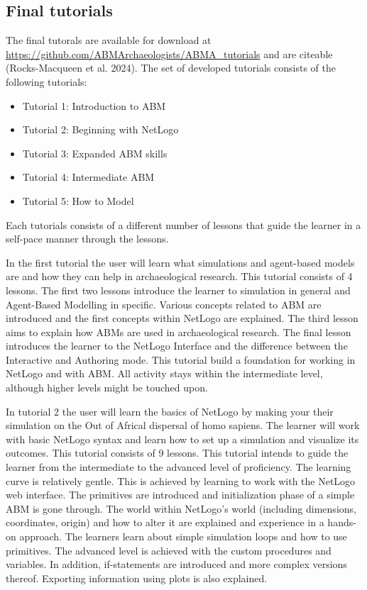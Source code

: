 \documentclass[
]{article}
\begin{document}
\hypertarget{final-tutorials}{%
\subsection{Final tutorials}\label{final-tutorials}}

The final tutorals are available for download at \url{https://github.com/ABMArchaeologists/ABMA_tutorials} and are citeable (Rocks-Macqueen et al. 2024). The set of developed tutorials consists of the following tutorials:

\begin{itemize}
\item
  Tutorial 1: Introduction to ABM
\item
  Tutorial 2: Beginning with NetLogo
\item
  Tutorial 3: Expanded ABM skills
\item
  Tutorial 4: Intermediate ABM
\item
  Tutorial 5: How to Model
\end{itemize}

Each tutorials consists of a different number of lessons that guide the learner in a self-pace manner through the lessons.

In the first tutorial the user will learn what simulations and agent-based models are and how they can help in archaeological research. This tutorial consists of 4 lessons. The first two lessons introduce the learner to simulation in general and Agent-Based Modelling in specific. Various concepts related to ABM are introduced and the first concepts within NetLogo are explained. The third lesson aims to explain how ABMs are used in archaeological research. The final lesson introduces the learner to the NetLogo Interface and the difference between the Interactive and Authoring mode. This tutorial build a foundation for working in NetLogo and with ABM. All activity stays within the intermediate level, although higher levels might be touched upon.

In tutorial 2 the user will learn the basics of NetLogo by making your their simulation on the Out of Africal dispersal of homo sapiens. The learner will work with basic NetLogo syntax and learn how to set up a simulation and visualize its outcomes. This tutorial consists of 9 lessons. This tutorial intends to guide the learner from the intermediate to the advanced level of proficiency. The learning curve is relatively gentle. This is achieved by learning to work with the NetLogo web interface. The primitives are introduced and initialization phase of a simple ABM is gone through. The world within NetLogo's world (including dimensions, coordinates, origin) and how to alter it are explained and experience in a hands-on approach. The learners learn about simple simulation loops and how to use primitives. The advanced level is achieved with the custom procedures and variables. In addition, if-statements are introduced and more complex versions thereof. Exporting information using plots is also explained.
\end{document}
